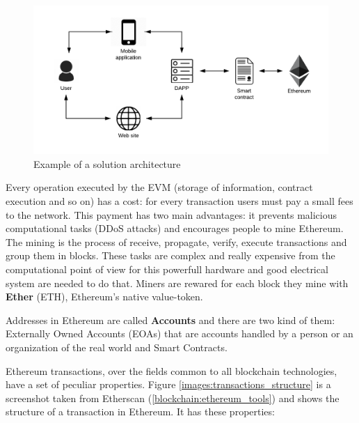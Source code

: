 \begin{figure}[!ht]
    \centering
\includegraphics[width=\textwidth]{images/solution_architecture.png}
    \caption{Example of a solution architecture}
    \label{images:solution_architecture}
\end{figure}

Every operation executed by the EVM (storage of information, contract execution and so on) has a cost: for every transaction 
users must pay a small fees to the network. This payment has two main advantages: it prevents malicious computational tasks 
(DDoS attacks) and encourages people to mine Ethereum. The mining is the process of receive, propagate, verify, execute 
transactions and group them in blocks. These tasks are complex and really expensive from the computational point of view for 
this powerfull hardware and good electrical system are needed to do that. Miners are rewared for each block they mine with 
\textbf{Ether} (ETH), Ethereum’s native value-token.

Addresses in Ethereum are called \textbf{Accounts} and there are two kind of them: Externally Owned Accounts (EOAs) that are 
accounts handled by a person or an organization of the real world and Smart Contracts.

Ethereum transactions, over the fields common to all blockchain technologies, have a set of peculiar properties. Figure 
\ref{images:transactions_structure} is a screenshot taken from Etherscan (\ref{blockchain:ethereum_tools}) and shows the 
structure of a transaction in Ethereum. It has these properties:

